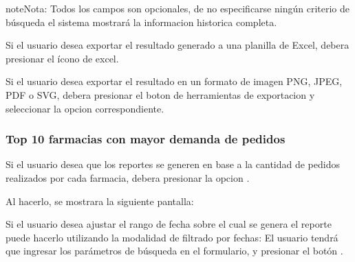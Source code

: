 \documentclass[a4paper,10pt,spanish]{sphinxmanual}
\begin{document}
\begin{notice}{note}{Nota:}
Todos los campos son opcionales, de no especificarse ningún criterio de búsqueda el sistema mostrará la informacion historica completa.
\end{notice}


Si el usuario desea exportar el resultado generado a una planilla de Excel, debera presionar el ícono de excel.


Si el usuario desea exportar el resultado en un formato de imagen PNG, JPEG, PDF o SVG, debera presionar el boton de herramientas de exportacion y seleccionar la opcion correspondiente.



\subsubsection{Top 10 farmacias con mayor demanda de pedidos}
\label{pedidosfarmacia:top10-peds-pf}\label{pedidosfarmacia:top-10-farmacias-con-mayor-demanda-de-pedidos}
Si el usuario desea que los reportes se generen en base a la cantidad de pedidos realizados por cada farmacia, debera presionar la opcion .


Al hacerlo, se mostrara la siguiente pantalla:


Si el usuario desea ajustar el rango de fecha sobre el cual se genera el reporte puede hacerlo utilizando la modalidad de filtrado por fechas:
El usuario tendrá que ingresar los parámetros de búsqueda en el formulario, y presionar el botón .
\end{document}
